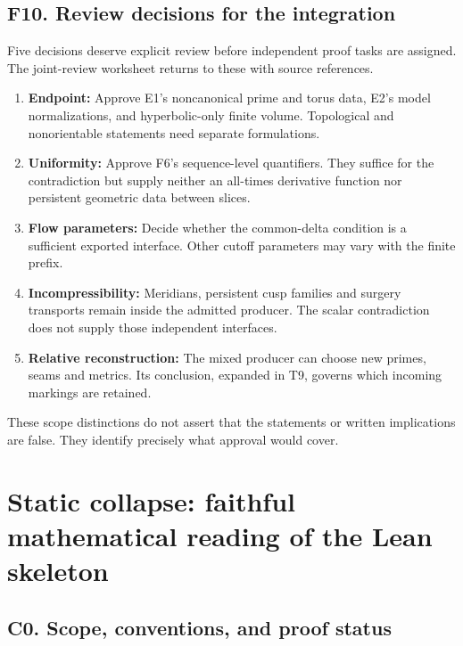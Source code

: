 \documentclass[
  letterpaper,
  11pt]{article}
\providecommand{\tightlist}{%
  \setlength{\itemsep}{0pt}\setlength{\parskip}{0pt}}
\begin{document}
\subsection{F10. Review decisions for the
integration}\label{f10-review-decisions}

Five decisions deserve explicit review before independent proof tasks
are assigned. The joint-review worksheet returns to these with source
references.

\begin{enumerate}
\def\labelenumi{\arabic{enumi}.}
\tightlist
\item
  \textbf{Endpoint:} Approve E1's noncanonical prime and torus data,
  E2's model normalizations, and hyperbolic-only finite volume.
  Topological and nonorientable statements need separate formulations.
\item
  \textbf{Uniformity:} Approve F6's sequence-level quantifiers. They
  suffice for the contradiction but supply neither an all-times
  derivative function nor persistent geometric data between slices.
\item
  \textbf{Flow parameters:} Decide whether the common-delta condition is
  a sufficient exported interface. Other cutoff parameters may vary with
  the finite prefix.
\item
  \textbf{Incompressibility:} Meridians, persistent cusp families and
  surgery transports remain inside the admitted producer. The scalar
  contradiction does not supply those independent interfaces.
\item
  \textbf{Relative reconstruction:} The mixed producer can choose new
  primes, seams and metrics. Its conclusion, expanded in T9, governs
  which incoming markings are retained.
\end{enumerate}

These scope distinctions do not assert that the statements or written
implications are false. They identify precisely what approval would
cover.

\section{Static collapse: faithful mathematical reading of the Lean
skeleton}\label{static-collapse-faithful-mathematical-reading-of-the-lean-skeleton}

\subsection{C0. Scope, conventions, and proof
status}\label{collapse-scope}
\end{document}
